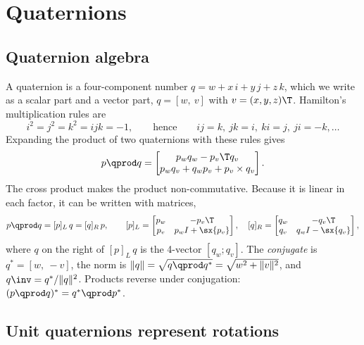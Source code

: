 \section{Quaternions}
\label{sec:quaternions}

\subsection{Quaternion algebra}

A quaternion is a four-component number $q = w + x\,i + y\,j + z\,k$, which we write as a scalar part
and a vector part, $q = [w,\ v]$ with $v = (x,y,z)\T$. Hamilton's multiplication rules are
\begin{equation}
  i^2 = j^2 = k^2 = ijk = -1, \qquad\text{hence}\qquad ij = k,\ jk = i,\ ki = j,\ ji = -k, \dots
\end{equation}
Expanding the product of two quaternions with these rules gives
\begin{equation}
  p \qprod q = \begin{bmatrix} p_w q_w - p_v\T q_v \\ p_w q_v + q_w p_v + p_v \times q_v \end{bmatrix}.
  \label{eq:qprod}
\end{equation}
The cross product makes the product non-commutative. Because it is linear in each factor, it can be
written with matrices,
\begin{equation}
  p\qprod q = [p]_L\, q = [q]_R\, p, \qquad
  [p]_L = \begin{bmatrix} p_w & -p_v\T \\ p_v & p_w I + \sx{p_v} \end{bmatrix}, \quad
  [q]_R = \begin{bmatrix} q_w & -q_v\T \\ q_v & q_w I - \sx{q_v} \end{bmatrix},
\end{equation}
where $q$ on the right of $[p]_L\,q$ is the 4-vector $[q_w; q_v]$. The \emph{conjugate} is
$q^* = [w,\ -v]$, the norm is $\|q\| = \sqrt{q\qprod q^*} = \sqrt{w^2 + \|v\|^2}$, and
$q\inv = q^*/\|q\|^2$. Products reverse under conjugation: $(p\qprod q)^* = q^*\qprod p^*$.

\subsection{Unit quaternions represent rotations}

